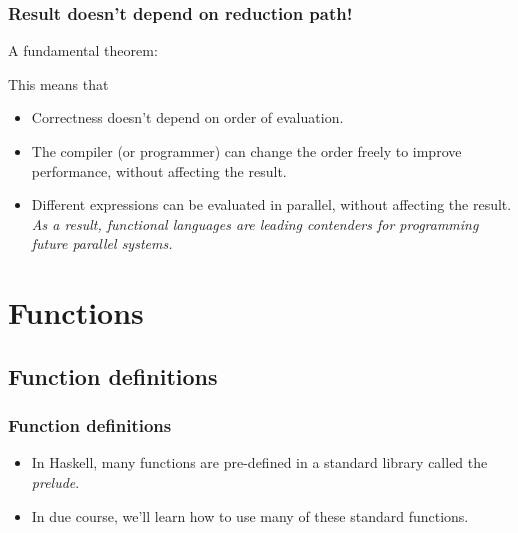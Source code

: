\documentclass{beamer}
\begin{document}
\begin{frame}
\frametitle{Result doesn't depend on reduction path!}

A fundamental theorem:

\begin{center}
\end{center}

This means that
\begin{itemize}
\item Correctness doesn't depend on order of evaluation.
\item The compiler (or programmer) can change the order freely to
  improve performance, without affecting the result.
\item Different expressions can be evaluated in parallel, without
  affecting the result.  {\redtext \emph{As a result, functional
      languages are leading contenders for programming future
      parallel systems.}}
\end{itemize}

\end{frame}

\section{Functions}

\subsection{Function definitions}

\begin{frame}[fragile]
\frametitle{Function definitions}

\begin{itemize}
\item In Haskell, many functions are pre-defined in a standard
  library called the  \emph{prelude}.%
\item In due course, we'll learn how to use many of these standard
  functions.
\end{itemize}

\end{frame}
\end{document}
